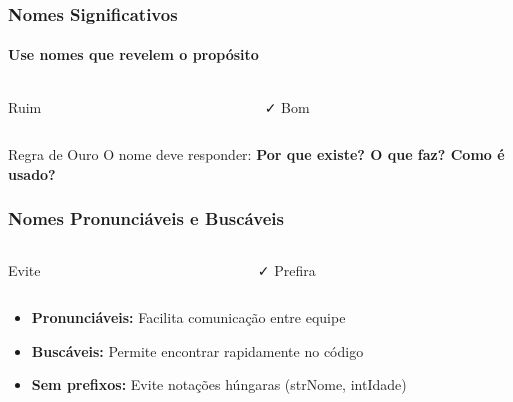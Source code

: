 \documentclass[aspectratio=169]{beamer}
\begin{document}
\begin{frame}
\frametitle{Nomes Significativos}
\framesubtitle{Use nomes que revelem o propósito}

\begin{columns}
\begin{column}{0.5\textwidth}
\begin{block}{\textcolor{cleanred}{\faTimes} Ruim}
\scriptsize

\end{block}
\end{column}

\begin{column}{0.5\textwidth}
\begin{block}{\textcolor{cleangreen}{\faCheck} Bom}
\scriptsize

\end{block}
\end{column}
\end{columns}

\vspace{0.3cm}
\begin{alertblock}{Regra de Ouro}
\centering
\footnotesize
O nome deve responder: \textbf{Por que existe? O que faz? Como é usado?}
\end{alertblock}
\end{frame}

\begin{frame}
\frametitle{Nomes Pronunciáveis e Buscáveis}

\begin{columns}
\begin{column}{0.5\textwidth}
\begin{block}{\textcolor{cleanred}{\faTimes} Evite}
\scriptsize

\end{block}
\end{column}

\begin{column}{0.5\textwidth}
\begin{block}{\textcolor{cleangreen}{\faCheck} Prefira}
\scriptsize

\end{block}
\end{column}
\end{columns}

\vspace{0.3cm}
\footnotesize
\begin{itemize}
    \item \textbf{Pronunciáveis:} Facilita comunicação entre equipe
    \item \textbf{Buscáveis:} Permite encontrar rapidamente no código
    \item \textbf{Sem prefixos:} Evite notações húngaras (strNome, intIdade)
\end{itemize}
\end{frame}
\end{document}
